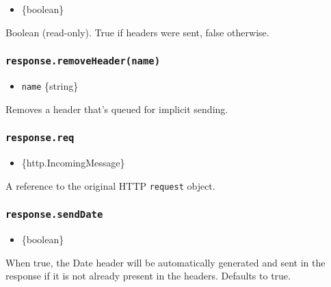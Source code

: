 \begin{itemize}
\tightlist
\item
  \{boolean\}
\end{itemize}

Boolean (read-only). True if headers were sent, false otherwise.

\subsubsection{\texorpdfstring{\texttt{response.removeHeader(name)}}{response.removeHeader(name)}}\label{response.removeheadername}

\begin{itemize}
\tightlist
\item
  \texttt{name} \{string\}
\end{itemize}

Removes a header that's queued for implicit sending.

\begin{Shaded}
\begin{Highlighting}[]
\NormalTok{(}\NormalTok{)}\OperatorTok{;}
\end{Highlighting}
\end{Shaded}

\subsubsection{\texorpdfstring{\texttt{response.req}}{response.req}}\label{response.req}

\begin{itemize}
\tightlist
\item
  \{http.IncomingMessage\}
\end{itemize}

A reference to the original HTTP \texttt{request} object.

\subsubsection{\texorpdfstring{\texttt{response.sendDate}}{response.sendDate}}\label{response.senddate}

\begin{itemize}
\tightlist
\item
  \{boolean\}
\end{itemize}

When true, the Date header will be automatically generated and sent in
the response if it is not already present in the headers. Defaults to
true.

